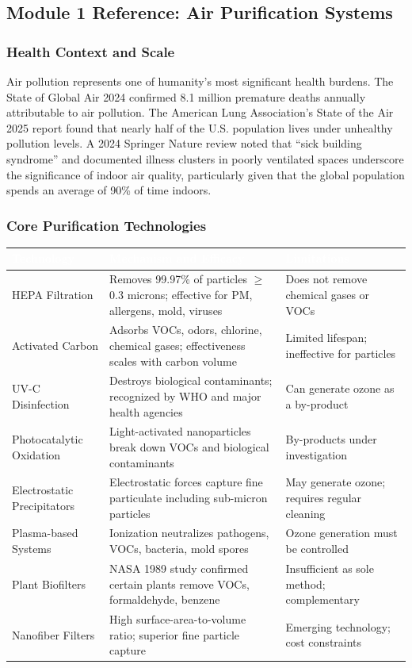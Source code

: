 \documentclass[11pt,letterpaper]{article}
\newcommand{\tableheader}[1]{\textbf{\sffamily\textcolor{white}{#1}}}
\begin{document}
\subsection{Module 1 Reference: Air Purification Systems}

\subsubsection{Health Context and Scale}

Air pollution represents one of humanity's most significant health burdens. The State of Global Air 2024 confirmed 8.1 million premature deaths annually attributable to air pollution. The American Lung Association's State of the Air 2025 report found that nearly half of the U.S. population lives under unhealthy pollution levels. A 2024 Springer Nature review noted that ``sick building syndrome'' and documented illness clusters in poorly ventilated spaces underscore the significance of indoor air quality, particularly given that the global population spends an average of 90\% of time indoors.

\subsubsection{Core Purification Technologies}

\begin{center}
\begin{tabularx}{\textwidth}{L{3cm}XL{3.5cm}}
\toprule
{}
\tableheader{Technology} & \tableheader{Mechanism and Efficacy} & \tableheader{Limitations} \\
\midrule
HEPA Filtration & Removes 99.97\% of particles $\geq$0.3 microns; effective for PM, allergens, mold, viruses & Does not remove chemical gases or VOCs \\
Activated Carbon & Adsorbs VOCs, odors, chlorine, chemical gases; effectiveness scales with carbon volume & Limited lifespan; ineffective for particles \\
UV-C Disinfection & Destroys biological contaminants; recognized by WHO and major health agencies & Can generate ozone as a by-product \\
Photocatalytic Oxidation & Light-activated nanoparticles break down VOCs and biological contaminants & By-products under investigation \\
Electrostatic Precipitators & Electrostatic forces capture fine particulate including sub-micron particles & May generate ozone; requires regular cleaning \\
Plasma-based Systems & Ionization neutralizes pathogens, VOCs, bacteria, mold spores & Ozone generation must be controlled \\
Plant Biofilters & NASA 1989 study confirmed certain plants remove VOCs, formaldehyde, benzene & Insufficient as sole method; complementary \\
Nanofiber Filters & High surface-area-to-volume ratio; superior fine particle capture & Emerging technology; cost constraints \\
\bottomrule
\end{tabularx}
\end{center}
\end{document}
